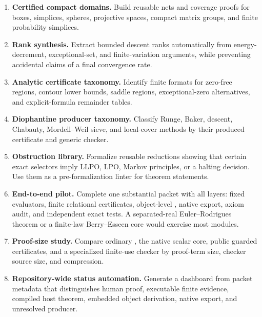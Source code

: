 \begin{enumerate}[label=\arabic*.]
\item \textbf{Certified compact domains.}  Build reusable nets and coverage proofs for boxes, simplices, spheres, projective spaces, compact matrix groups, and finite probability simplices.

\item \textbf{Rank synthesis.}  Extract bounded descent ranks automatically from energy-decrement, exceptional-set, and finite-variation arguments, while preventing accidental claims of a final convergence rate.

\item \textbf{Analytic certificate taxonomy.}  Identify finite formats for zero-free regions, contour lower bounds, saddle regions, exceptional-zero alternatives, and explicit-formula remainder tables.

\item \textbf{Diophantine producer taxonomy.}  Classify Runge, Baker, descent, Chabauty, Mordell--Weil sieve, and local-cover methods by their produced certificate and generic checker.

\item \textbf{Obstruction library.}  Formalize reusable reductions showing that certain exact selectors imply LLPO, LPO, Markov principles, or a halting decision.  Use them as a pre-formalization linter for theorem statements.

\item \textbf{End-to-end pilot.}  Complete one substantial packet with all layers: fixed evaluators, finite relational certificates, object-level , native export, axiom audit, and independent exact tests.  A separated-real Euler--Rodrigues theorem or a finite-law Berry--Esseen core would exercise most modules.

\item \textbf{Proof-size study.}  Compare ordinary , the native scalar core, public guarded certificates, and a specialized finite-use checker by proof-term size, checker source size, and compression.

\item \textbf{Repository-wide status automation.}  Generate a dashboard from packet metadata that distinguishes human proof, executable finite evidence, compiled host theorem, embedded object derivation, native export, and unresolved producer.
\end{enumerate}
